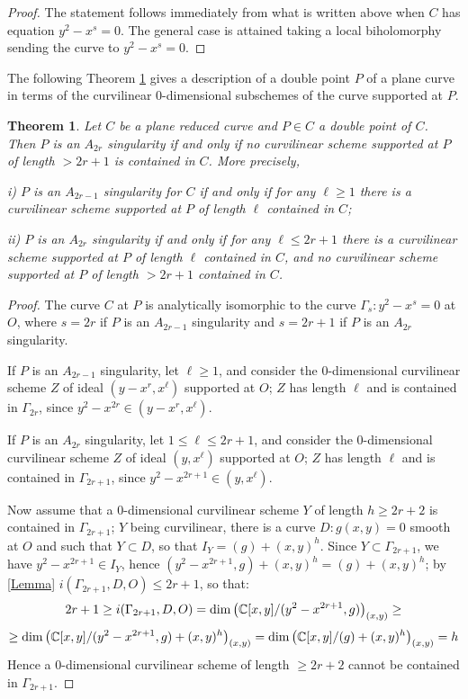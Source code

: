 \documentclass[draft]{amsart}
\newtheorem{thm}{Theorem}[section]
\theoremstyle{definition}
\theoremstyle{remark}
\theoremstyle{definition}
\def\a{\bigskip \par \noindent}
\def\dd{\medskip \par \noindent}
\def\C{\Bbb C}
\def\C{\Bbb C}
\begin{document}
\begin{proof}
\a {\it iv)}  The statement follows immediately from what is written above when $C$ has equation $y^2-x^s=0$. The general case is attained taking a local biholomorphy sending the curve to $y^2-x^s=0$.   

\end{proof}

\medskip
The following Theorem \ref{curvi}  gives a description of a double point $P$ of a plane curve in terms of the curvilinear 0-dimensional subschemes of the curve supported at $P$.

\medskip
\begin{thm}\label{curvi}  Let $C$ be a plane reduced curve and $P\in C$ a double point of $C$. Then $P$ is an $A_{2r}$ singularity if and only if no curvilinear scheme supported at $P$ of length $> 2r+1$ is contained in $C$. More precisely,

\dd i)  $P$ is an $A_{2r-1}$ singularity for $C$ if and only if  for any $\ell \geq 1$ there is a curvilinear scheme supported at $P$ of length $\ell$ contained in $C$;

\dd ii) $P$ is an $A_{2r}$ singularity if and only if for any $\ell \leq 2r+1$ there is a curvilinear scheme supported at $P$ of length $\ell $ contained in $C$, and no curvilinear scheme supported at $P$  of length $> 2r+1$ contained in $C$.
\end{thm}
\begin{proof}


The curve $C$ at $P$ is analytically isomorphic  to the curve $\Gamma_s: y^2-x^s=0$ at $O$, where $s=2r$ if $P$ is an $A_{2r-1}$ singularity and $s=2r+1$ if $P$ is an $A_{2r}$ singularity. 
\dd {\it i)}  If $P$ is an $A_{2r-1}$ singularity, let $\ell \geq 1$, and consider the 0-dimensional curvilinear scheme $Z$ of ideal $(y-x^r,x^\ell)$ supported at $O$; $Z$ has length $\ell$ and is contained in $\Gamma_{2r}$, since $y^2-x^{2r}\in (y-x^r,x^\ell)$.

\dd {\it ii)}  If $P$ is an $A_{2r}$ singularity, let $1\leq \ell \leq 2r+1$, and consider the 0-dimensional curvilinear scheme $Z$ of ideal $(y,x^\ell)$ supported at $O$; $Z$ has length $\ell$ and is contained in $\Gamma_{2r+1}$, since $y^2-x^{2r+1}\in (y,x^\ell)$.
\dd Now assume that a 0-dimensional curvilinear scheme $Y$ of length $ h \geq 2r+2$ is contained in $\Gamma_{2r+1}$; $Y$ being curvilinear, there is a curve $D: g(x,y)=0$ smooth at $O$ and such that $Y\subset D$, so that $I_Y=(g)+(x,y)^h$. Since $Y\subset \Gamma_{2r+1}$, we have $y^2-x^{2r+1} \in I_Y$, hence $(y^2-x^{2r+1}, g)+ (x,y)^h=(g)+(x,y)^h$; 
by \ref{Lemma} $ i(\Gamma_{2r+1},D,O) \leq 2r+1$, so that:
$$2r+1 \geq  i(\Gamma_{2r+1},D,O) = {\rm dim} \left( \C[x,y]/(y^2-x^{2r+1}, g)\right)_{(x,y)}\geq $$ $$\geq  {\rm dim} \left( \C[x,y]/(y^2-x^{2r+1}, g)+(x,y)^h\right)_{(x,y)}= {\rm dim} \left( \C[x,y]/( g)+(x,y)^h\right)_{(x,y)}= h$$
Hence a 0-dimensional curvilinear scheme of length $ \geq 2r+2$ cannot be contained in $\Gamma_{2r+1}$.

\end{proof}
\end{document}
